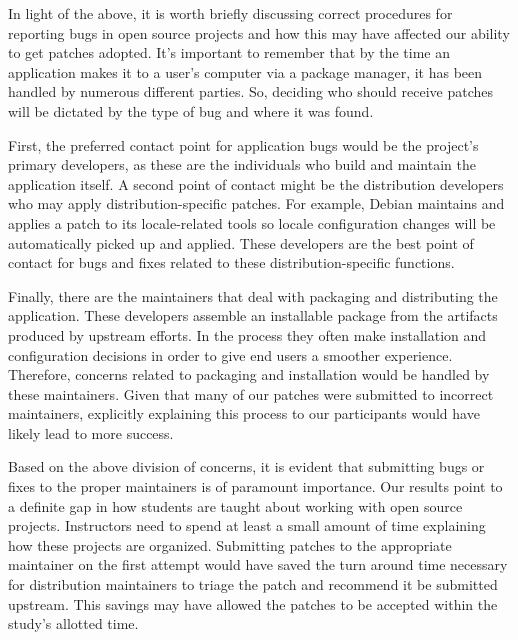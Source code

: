 In light of the above, it is worth briefly discussing correct procedures for reporting bugs in open source projects and how this may have affected our ability to get patches adopted. It's important to remember that by the time an application makes it to a user's computer via a package manager, it has been handled by numerous different parties. So, deciding who should receive patches will be dictated by the type of bug and where it was found. 

First, the preferred contact point for application bugs would be  
the project's primary developers, as these are the individuals who build and maintain the application itself.
A second point of contact might be the distribution developers who may apply distribution-specific patches. For example, Debian maintains and applies a patch to its locale-related tools so locale configuration changes will be automatically picked up and applied.
These developers are the best point of contact for bugs and fixes related to these distribution-specific functions.

Finally,
there are the maintainers that deal with 
packaging and distributing the application.
These developers assemble an installable package from the artifacts produced by upstream efforts.
In the process they often make installation and configuration decisions in order to give end users a smoother experience. 
Therefore, concerns related to packaging and installation would be handled by these maintainers.
Given that many of our patches were submitted to incorrect maintainers,
explicitly explaining this process to our participants would have likely lead to more success.

Based on the above division of concerns,
it is evident that submitting bugs or fixes to the proper maintainers is of paramount importance.
Our results point to a definite gap in how students are taught about working with open source projects.
Instructors need to spend at least a  small amount of time explaining how these projects are organized.
Submitting patches to the appropriate maintainer on the first attempt would have saved the turn around time necessary for distribution maintainers to triage the patch and recommend it be submitted upstream.
This savings may have allowed the patches to be accepted within the study's allotted time.